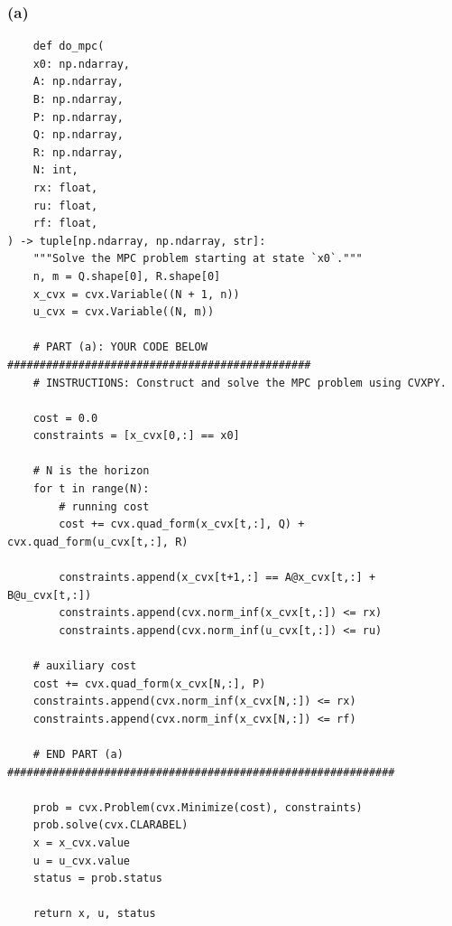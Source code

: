 \subsubsection*{(a)}
\begin{lstlisting}
    def do_mpc(
    x0: np.ndarray,
    A: np.ndarray,
    B: np.ndarray,
    P: np.ndarray,
    Q: np.ndarray,
    R: np.ndarray,
    N: int,
    rx: float,
    ru: float,
    rf: float,
) -> tuple[np.ndarray, np.ndarray, str]:
    """Solve the MPC problem starting at state `x0`."""
    n, m = Q.shape[0], R.shape[0]
    x_cvx = cvx.Variable((N + 1, n))
    u_cvx = cvx.Variable((N, m))

    # PART (a): YOUR CODE BELOW ###############################################
    # INSTRUCTIONS: Construct and solve the MPC problem using CVXPY.

    cost = 0.0
    constraints = [x_cvx[0,:] == x0]
    
    # N is the horizon
    for t in range(N):
        # running cost
        cost += cvx.quad_form(x_cvx[t,:], Q) + cvx.quad_form(u_cvx[t,:], R)

        constraints.append(x_cvx[t+1,:] == A@x_cvx[t,:] + B@u_cvx[t,:])
        constraints.append(cvx.norm_inf(x_cvx[t,:]) <= rx)
        constraints.append(cvx.norm_inf(u_cvx[t,:]) <= ru)

    # auxiliary cost
    cost += cvx.quad_form(x_cvx[N,:], P)
    constraints.append(cvx.norm_inf(x_cvx[N,:]) <= rx)
    constraints.append(cvx.norm_inf(x_cvx[N,:]) <= rf)

    # END PART (a) ############################################################

    prob = cvx.Problem(cvx.Minimize(cost), constraints)
    prob.solve(cvx.CLARABEL)
    x = x_cvx.value
    u = u_cvx.value
    status = prob.status

    return x, u, status
\end{lstlisting}

